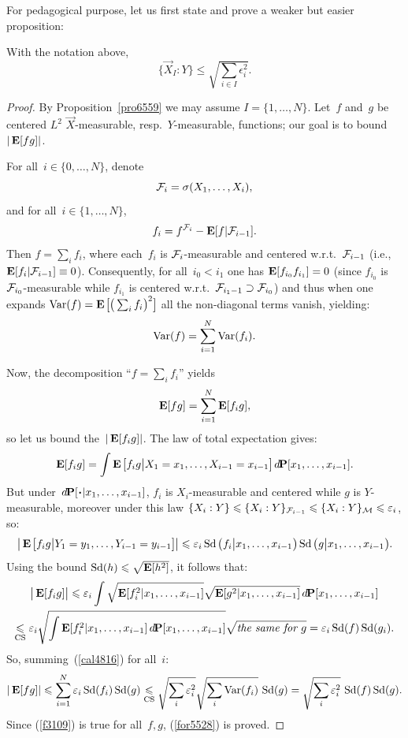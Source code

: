 For pedagogical purpose,
let us first state and prove a weaker but easier proposition:
%
\begin{Pro}\label{pro5527}
With the notation above,
\[\label{for5528} \big\{\vec{X}_I:Y\big\} \leq \sqrt{\sum_{i\in I} \epsilon_i^2} .\]
\end{Pro}

\begin{proof}
By Proposition~\ref{pro6559} we may assume $I=\{1,\ldots,N\}$.
Let~$f$ and~$g$ be centered $L^2$ $\vec{X}$-measurable,
resp.\ $Y$-measurable, functions; our goal is to bound $|\mathop{\smash{\mathbf{E}}}\nolimits[fg]|$.

For all~$i\in\{0,\ldots,N\}$, denote
\[ \mathcal{F}_i = \sigma(X_1,\ldots,X_i) ,\]
and for all~$i\in\{1,\ldots,N\}$,
\[ f_i = f^{\mathcal{F}_i} - \mathop{\smash{\mathbf{E}}}\nolimits[f|\mathcal{F}_{i-1}] .\]
%
Then $f = \sum_i f_i$, where each~$f_i$ is $\mathcal{F}_i$-measurable
and centered w.r.t.~$\mathcal{F}_{i-1}$ (i.e., $\mathop{\smash{\mathbf{E}}}\nolimits[f_i|\mathcal{F}_{i-1}] \equiv 0$).
Consequently, for all~$i_0<i_1$ one has $\mathop{\smash{\mathbf{E}}}\nolimits[f_{i_0}f_{i_1}] = 0$
(since $f_{i_0}$ is $\mathcal{F}_{i_0}$-measurable while
$f_{i_1}$ is centered w.r.t.~$\mathcal{F}_{i_1-1} \supset \mathcal{F}_{i_0}$)
and thus when one expands $\Var(f) = \EE\big[\big(\sum_i f_i\big)^2\big]$
all the non-diagonal terms vanish, yielding:
\[\label{f9207} \operatorname{Var}(f) = \sum_{i=1}^{N} \operatorname{Var}(f_i) .\]

Now, the decomposition ``$f = \sum_i f_i$'' yields
\[ \mathop{\smash{\mathbf{E}}}\nolimits[fg] = \sum_{i=1}^{N} \mathop{\smash{\mathbf{E}}}\nolimits[f_ig] ,\]
so let us bound the~$|\mathop{\smash{\mathbf{E}}}\nolimits[f_ig]|$.
The law of total expectation gives:
\[ \EE[f_ig] =
\int \EE\big[f_ig\big|X_1=x_1,\ldots,X_{i-1}=x_{i-1}\big] \,\dx\Pr[x_1,\ldots,x_{i-1}] .\]
But under~$\dx\Pr[\Bcdot|\ab x_1,\ldots,x_{i-1}]$,
$f_i$ is $X_i$-measurable and centered while $g$ is $Y$-mea\-su\-ra\-ble,
moreover under this law
$\{X_i:Y\} \leqslant \{X_i:Y\}_{\mathcal{F}_{i-1}} \leqslant \{X_i:Y\}_{\mathcal{M}} \leqslant \varepsilon_i$, so:
\[ \big|\EE\big[f_ig\big|Y_1=y_1,\ldots,Y_{i-1}=y_{i-1}\big]\big| \leq \epsilon_i
\ecty\big(f_i\big|x_1,\ldots,x_{i-1}\big) \ecty\big(g\big|x_1,\ldots,x_{i-1}\big) .\]
%
Using the bound $\operatorname{Sd}(h) \leqslant \sqrt{\mathop{\smash{\mathbf{E}}}\nolimits[h^2]}$, it follows that:
\begin{multline}\label{cal4816}
\big|\EE[f_ig]\big| \leq \epsilon_i
\int \sqrt{\EE[f_i^2|x_1,\ldots,x_{i-1}]} \sqrt{\EE[g^2|x_1,\ldots,x_{i-1}]}
\,\dx\Pr[x_1,\ldots,x_{i-1}] \\
\footrel{\text{CS}}{\leq} \epsilon_i \sqrt{\int\EE[f_i^2|x_1,\ldots,x_{i-1}]\,\dx\Pr[x_1,\ldots,x_{i-1}]}\sqrt{\textit{the same for~$g$}}
= \epsilon_i \ecty(f) \ecty(g_i) .
\end{multline}
So, summing~(\ref{cal4816}) for all~$i$:
\[\label{f3109} |\mathop{\smash{\mathbf{E}}}\nolimits[fg]| \leqslant \sum_{i=1}^N \varepsilon_i \operatorname{Sd}(f_i) \operatorname{Sd}(g)
\underset{\text{CS}}{\leqslant} \sqrt{\sum_i \varepsilon_i^2} \sqrt{\sum_i \operatorname{Var}(f_i)} \, \operatorname{Sd}(g)
= \sqrt{\sum_i \varepsilon_i^2} \, \operatorname{Sd}(f) \operatorname{Sd}(g) .\]
Since (\ref{f3109}) is true for all~$f,g$, (\ref{for5528}) is proved.
\end{proof}


